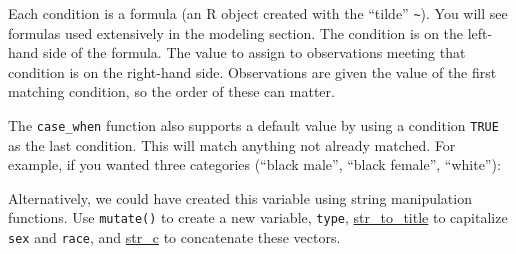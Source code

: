 \documentclass[]{book}
\newenvironment{Shaded}{\begin{snugshade}}{\end{snugshade}}
\newcommand{\KeywordTok}[1]{\textcolor[rgb]{0.13,0.29,0.53}{\textbf{#1}}}
\newcommand{\DataTypeTok}[1]{\textcolor[rgb]{0.13,0.29,0.53}{#1}}
\newcommand{\StringTok}[1]{\textcolor[rgb]{0.31,0.60,0.02}{#1}}
\newcommand{\CommentTok}[1]{\textcolor[rgb]{0.56,0.35,0.01}{\textit{#1}}}
\newcommand{\OtherTok}[1]{\textcolor[rgb]{0.56,0.35,0.01}{#1}}
\newcommand{\OperatorTok}[1]{\textcolor[rgb]{0.81,0.36,0.00}{\textbf{#1}}}
\newcommand{\NormalTok}[1]{#1}
\theoremstyle{definition}
\theoremstyle{definition}
\theoremstyle{definition}
\theoremstyle{remark}
\begin{document}
Each condition is a formula (an R object created with the ``tilde''
\texttt{\textasciitilde{}}). You will see formulas used extensively in
the modeling section. The condition is on the left-hand side of the
formula. The value to assign to observations meeting that condition is
on the right-hand side. Observations are given the value of the first
matching condition, so the order of these can matter.

The \texttt{case\_when} function also supports a default value by using
a condition \texttt{TRUE} as the last condition. This will match
anything not already matched. For example, if you wanted three
categories (``black male'', ``black female'', ``white''):

\begin{Shaded}
\end{Shaded}

Alternatively, we could have created this variable using string
manipulation functions. Use \texttt{mutate()} to create a new variable,
\texttt{type},
\href{https://www.rdocumentation.org/packages/stringr/topics/str_to_title}{str\_to\_title}
to capitalize \texttt{sex} and \texttt{race}, and
\href{https://www.rdocumentation.org/packages/stringr/topics/str_c}{str\_c}
to concatenate these vectors.

\begin{Shaded}
\end{Shaded}
\end{document}
